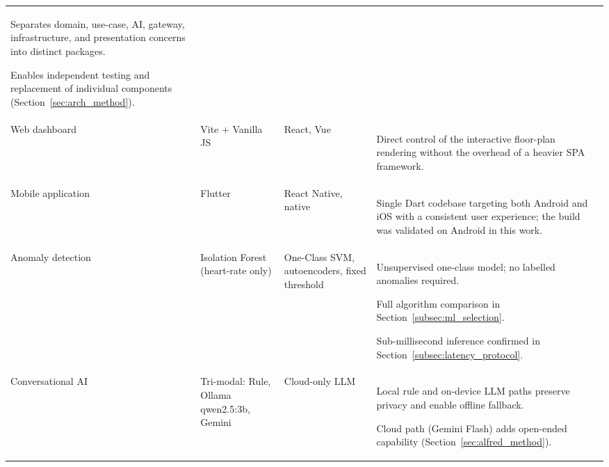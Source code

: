 \begin{table}[p]
\begin{tabularx}{\textwidth}{@{} >{\raggedright\arraybackslash}p{2.5cm} >{\raggedright\arraybackslash}p{3.0cm} >{\raggedright\arraybackslash}p{2.6cm} >{\raggedright\arraybackslash}X @{}}
  \begin{tblitem}
    \item Separates domain, use-case, AI, gateway, infrastructure, and presentation concerns into distinct packages.
    \item Enables independent testing and replacement of individual components (Section~\ref{sec:arch_method}).
  \end{tblitem} \\
\addlinespace[4pt]
Web dashboard & Vite + Vanilla JS & React, Vue &
  \begin{tblitem}
    \item Direct control of the interactive floor-plan rendering without the overhead of a heavier SPA framework.
  \end{tblitem} \\
\addlinespace[4pt]
Mobile application & Flutter & React Native, native &
  \begin{tblitem}
    \item Single Dart codebase targeting both Android and iOS with a consistent user experience; the build was validated on Android in this work.
  \end{tblitem} \\
\addlinespace[4pt]
Anomaly detection & Isolation Forest (heart-rate only) & One-Class SVM, autoencoders, fixed threshold &
  \begin{tblitem}
    \item Unsupervised one-class model; no labelled anomalies required.
    \item Full algorithm comparison in Section~\ref{subsec:ml_selection}.
    \item Sub-millisecond inference confirmed in Section~\ref{subsec:latency_protocol}.
  \end{tblitem} \\
\addlinespace[4pt]
Conversational AI & Tri-modal: Rule, Ollama qwen2.5:3b, Gemini & Cloud-only LLM &
  \begin{tblitem}
    \item Local rule and on-device LLM paths preserve privacy and enable offline fallback.
    \item Cloud path (Gemini Flash) adds open-ended capability (Section~\ref{sec:alfred_method}).
  \end{tblitem} \\
\bottomrule
\end{tabularx}
\end{table}
